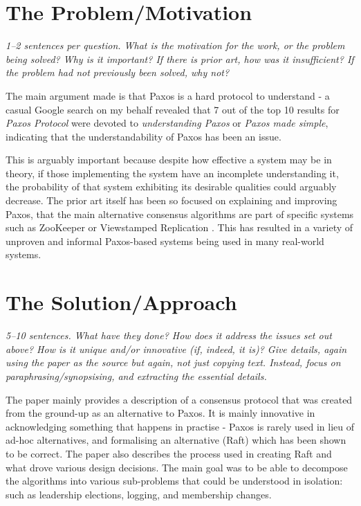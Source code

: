 \documentclass[11pt]{article}
\begin{document}
\section*{The Problem/Motivation}

\textsl{1--2 sentences per question. What is the motivation for the work, or
the problem being solved? Why is it important? If there is prior art, how was
it insufficient? If the problem had not previously been solved, why not?}

The main argument made is that Paxos is a hard protocol to understand - a
casual Google search \cite{PaxosSearch} on my behalf revealed that 7 out of the
top 10 results for \textit{Paxos Protocol} were devoted to
\textit{understanding Paxos} or \textit{Paxos made simple}, indicating that the
understandability of Paxos has been an issue.

This is arguably important because despite how effective a system may be in
theory, if those implementing the system have an incomplete understanding it,
the probability of that system exhibiting its desirable qualities could
arguably decrease. The prior art itself has been so focused on explaining and
improving Paxos, that the main alternative consensus algorithms are part of
specific systems such as ZooKeeper \cite{ZooKeeper} or Viewstamped Replication
\cite{ViewstampedReplication}. This has resulted in a variety of unproven and
informal Paxos-based systems being used in many real-world systems.

\section*{The Solution/Approach}

\textsl{5--10 sentences. What have they done? How does it address the issues
set out above? How is it unique and/or innovative (if, indeed, it is)? Give
details, again using the paper as the source but again, not just copying text.
Instead, focus on paraphrasing/synopsising, and extracting the essential
details.}

The paper mainly provides a description of a consensus protocol that was
created from the ground-up as an alternative to Paxos. It is mainly innovative
in acknowledging something that happens in practise - Paxos is rarely used in
lieu of ad-hoc alternatives, and formalising an alternative (Raft) which has
been shown to be correct. The paper also describes the process used in creating
Raft and what drove various design decisions. The main goal was to be able to
decompose the algorithms into various sub-problems that could be understood in
isolation: such as leadership elections, logging, and membership changes.
\end{document}
